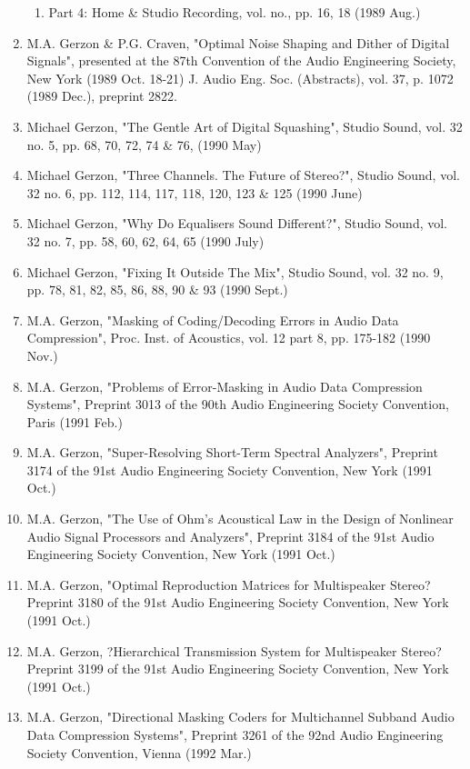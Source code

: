 \documentclass[9pt]{amsart}
\begin{document}
\begin{enumerate}
\begin{enumerate}
	\item Part 4: Home \& Studio Recording, vol. no., pp. 16, 18 (1989 Aug.)
	\end{enumerate}
\item M.A. Gerzon \& P.G. Craven, "Optimal Noise Shaping and Dither of Digital Signals", presented at the 87th Convention of the Audio Engineering Society, New York (1989 Oct. 18-21) J. Audio Eng. Soc. (Abstracts), vol. 37, p. 1072 (1989 Dec.), preprint 2822.
\item Michael Gerzon, "The Gentle Art of Digital Squashing", Studio Sound, vol. 32 no. 5, pp. 68, 70, 72, 74 \& 76, (1990 May)
\item Michael Gerzon, "Three Channels. The Future of Stereo?", Studio Sound, vol. 32 no. 6, pp. 112, 114, 117, 118, 120, 123 \& 125 (1990 June)
\item Michael Gerzon, "Why Do Equalisers Sound Different?", Studio Sound, vol. 32 no. 7, pp. 58, 60, 62, 64, 65 (1990 July)
\item Michael Gerzon, "Fixing It Outside The Mix", Studio Sound, vol. 32 no. 9, pp. 78, 81, 82, 85, 86, 88, 90 \& 93 (1990 Sept.)
\item M.A. Gerzon, "Masking of Coding/Decoding Errors in Audio Data Compression", Proc. Inst. of Acoustics, vol. 12 part 8, pp. 175-182 (1990 Nov.)
\item M.A. Gerzon, "Problems of Error-Masking in Audio Data Compression Systems", Preprint 3013 of the 90th Audio Engineering Society Convention, Paris (1991 Feb.)
\item M.A. Gerzon, "Super-Resolving Short-Term Spectral Analyzers", Preprint 3174 of the 91st Audio Engineering Society Convention, New York (1991 Oct.)
\item M.A. Gerzon, "The Use of Ohm's Acoustical Law in the Design of Nonlinear Audio Signal Processors and Analyzers", Preprint 3184 of the 91st Audio Engineering Society Convention, New York (1991 Oct.)
\item M.A. Gerzon, "Optimal Reproduction Matrices for Multispeaker Stereo? Preprint 3180 of the 91st Audio Engineering Society Convention, New York (1991 Oct.)
\item M.A. Gerzon, ?Hierarchical Transmission System for Multispeaker Stereo? Preprint 3199 of the 91st Audio Engineering Society Convention, New York (1991 Oct.)
\item M.A. Gerzon, "Directional Masking Coders for Multichannel Subband Audio Data Compression Systems", Preprint 3261 of the 92nd Audio Engineering Society Convention, Vienna (1992 Mar.)

\end{enumerate}
\end{document}
